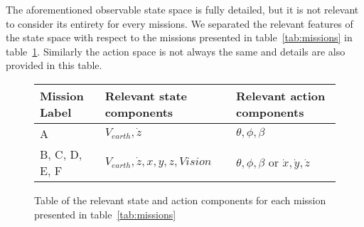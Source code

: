 \documentclass[]{article}
\begin{document}
\noindent The aforementioned observable state space is fully detailed, but it is not relevant to consider its entirety for every missions. We separated the relevant features of the state space with respect to the missions presented in table~\ref{tab:missions} in table~\ref{tab:obsstates}. Similarly the action space is not always the same and details are also provided in this table.

\begin{figure}[!h]
	\centering
	\begin{tabular}{m{3cm} m{5cm} m{5cm} }
		\toprule
		Mission Label & Relevant state components & Relevant action components \\ \midrule \midrule
		
		A & $V_{earth}, \dot{z}$ & $\theta, \phi, \beta$ \\ \midrule
		
		B, C, D, E, F & $V_{earth}, \dot{z}, x, y, z, Vision$ & $\theta, \phi, \beta$ or $\dot{x}, \dot{y}, \dot{z}$ \\ \bottomrule
	\end{tabular}
	\caption{Table of the relevant state and action components for each mission presented in table~\ref{tab:missions}}
	\label{tab:obsstates}
\end{figure}


\end{document}
